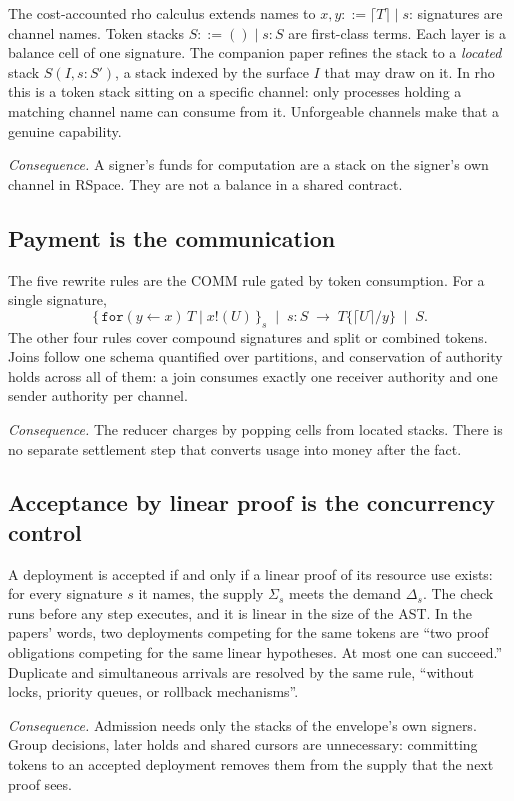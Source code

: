 \documentclass[11pt]{article}
\begin{document}
The cost-accounted rho calculus extends names to $x, y ::= \lceil T \rceil \mid s$: signatures are channel names. Token stacks $S ::= () \mid s : S$ are first-class terms. Each layer is a balance cell of one signature. The companion paper refines the stack to a \emph{located} stack $S(I, s : S')$, a stack indexed by the surface $I$ that may draw on it. In rho this is a token stack sitting on a specific channel: only processes holding a matching channel name can consume from it. Unforgeable channels make that a genuine capability.

\emph{Consequence.} A signer's funds for computation are a stack on the signer's own channel in RSpace. They are not a balance in a shared contract.

\subsection{Payment is the communication}

The five rewrite rules are the COMM rule gated by token consumption. For a single signature,
\[
\{\, \mathtt{for}(y \leftarrow x)\,T \mid x!(U) \,\}_s \;\mid\; s : S \;\longrightarrow\; T\{\lceil U\rceil/y\} \;\mid\; S .
\]
The other four rules cover compound signatures and split or combined tokens. Joins follow one schema quantified over partitions, and conservation of authority holds across all of them: a join consumes exactly one receiver authority and one sender authority per channel.

\emph{Consequence.} The reducer charges by popping cells from located stacks. There is no separate settlement step that converts usage into money after the fact.

\subsection{Acceptance by linear proof is the concurrency control}

A deployment is accepted if and only if a linear proof of its resource use exists: for every signature $s$ it names, the supply $\Sigma_s$ meets the demand $\Delta_s$. The check runs before any step executes, and it is linear in the size of the AST. In the papers' words, two deployments competing for the same tokens are ``two proof obligations competing for the same linear hypotheses. At most one can succeed.'' Duplicate and simultaneous arrivals are resolved by the same rule, ``without locks, priority queues, or rollback mechanisms''.

\emph{Consequence.} Admission needs only the stacks of the envelope's own signers. Group decisions, later holds and shared cursors are unnecessary: committing tokens to an accepted deployment removes them from the supply that the next proof sees.
\end{document}

